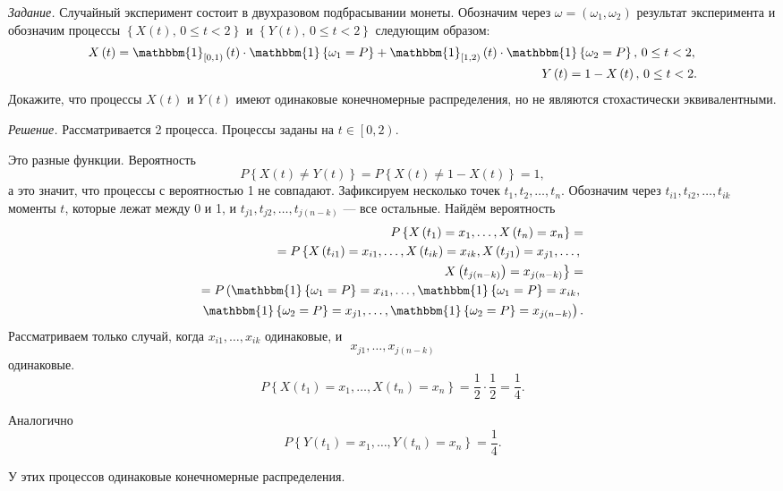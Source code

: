 \textit{Задание.}
Случайный эксперимент состоит в двухразовом подбрасывании монеты.
Обозначим через $ \omega = \left( \omega_1, \omega_2 \right) $
результат эксперимента и обозначим процессы $ \left\{ X \left( t \right), \, 0 \leq t < 2 \right\} $
и $ \left\{ Y \left( t \right), \, 0 \leq t < 2 \right\} $ следующим образом:
\begin{equation*}
  \begin{split}
    X \left( t \right) =
    \mathbbm{1}_{ \left[ 0, 1 \right) } \left( t \right) \cdot
    \mathbbm{1} \left\{ \omega_1 = P \right\} +
    \mathbbm{1}_{ \left[ 1, 2 \right) } \left( t \right) \cdot
    \mathbbm{1} \left\{ \omega_2 = P \right\}, \,
    0 \leq t < 2, \, \\
    Y \left( t \right) = 1 - X \left( t \right), \, 0 \leq t < 2.
  \end{split}
\end{equation*}
Докажите, что процессы $X \left( t \right) $ и $Y \left( t \right) $
имеют одинаковые конечномерные распределения, но не являются стохастически эквивалентными.

\textit{Решение.}
Рассматривается 2 процесса.
Процессы заданы на $t \in \left[ 0, 2 \right) $.

Это разные функции.
Вероятность
$$P \left\{ X \left( t \right) \neq Y \left( t \right) \right\} =
  P \left\{ X \left( t \right) \neq 1 - X \left( t \right) \right\} =
  1,$$
а это значит, что процессы с вероятностью 1 не совпадают.
Зафиксируем несколько точек $t_1, t_2, \dotsc, t_n$.
Обозначим через $t_{i1}, t_{i2}, \dotsc, t_{ik}$ моменты $t$, которые лежат между 0 и 1,
и $t_{j1}, t_{j2}, \dotsc, t_{j \left( n - k \right) }$ --- все остальные.
Найдём вероятность
\begin{equation*}
  \begin{split}
    P \left\{ X \left( t_1 \right) = x_1, \dotsc, X \left( t_n \right) = x_n \right\} = \\
    = P \left\{X \left( t_{i1} \right) = x_{i1}, \dotsc, X \left( t_{ik} \right) = x_{ik},
        X \left( t_{j1} \right) = x_{j1}, \dotsc, \right. \\
        \left. X \left( t_{j \left( n - k \right) } \right) = x_{j \left( n - k \right) }
      \right\} = \\
    = P \left(
      \mathbbm{1} \left\{ \omega_1 = P \right\} = x_{i1}, \dotsc,
      \mathbbm{1} \left\{ \omega_1 = P \right\} = x_{ik}, \right. \\
      \left. \mathbbm{1} \left\{ \omega_2 = P \right\} = x_{j1}, \dotsc,
      \mathbbm{1} \left\{ \omega_2 = P \right\} = x_{j \left( n - k \right) } \right).
  \end{split}
\end{equation*}
Рассматриваем только случай, когда $x_{i1}, \dotsc, x_{ik}$ одинаковые, и
$$x_{j1}, \dotsc, x_{j \left( n - k \right)}$$
одинаковые.
$$P \left\{ X \left( t_1 \right) = x_1, \dotsc, X \left( t_n \right) = x_n \right\} =
  \frac{1}{2} \cdot \frac{1}{2} =
  \frac{1}{4}.$$

Аналогично
$$P \left\{ Y \left( t_1 \right) = x_1, \dotsc, Y \left( t_n \right) = x_n \right\} =
  \frac{1}{4}.$$

У этих процессов одинаковые конечномерные распределения.
